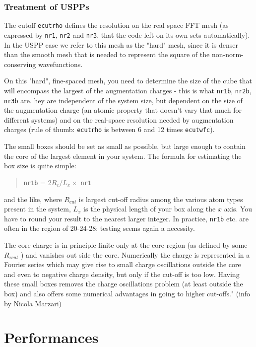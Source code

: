 \documentclass[12pt,a4paper]{article}
\begin{document}
\subsubsection{Treatment of USPPs}

The cutoff \texttt{ecutrho} defines the resolution on the real space FFT mesh (as expressed 
by \texttt{nr1}, \texttt{nr2} and \texttt{nr3}, that the code left on its own sets automatically).
In the USPP case we refer to this mesh as the "hard" mesh, since it 
is denser than the smooth mesh that is needed to represent the square 
of the non-norm-conserving wavefunctions.
  
On this "hard", fine-spaced mesh, you need to determine the size of the
cube that will encompass the largest of the augmentation charges - this
is what \texttt{nr1b}, \texttt{nr2b}, \texttt{nr3b} are. hey are independent 
of the system size, but dependent on the size
of the augmentation charge (an atomic property that doesn't vary 
that much for different systems) and on the
real-space resolution needed by augmentation charges (rule of thumb:
\texttt{ecutrho} is between 6 and 12 times \texttt{ecutwfc}).

The small boxes should be set as small as possible, but large enough
to contain the core of the largest element in your system.
The formula for estimating the box size is quite simple: 
\begin{quote}
   \texttt{nr1b} = $2 R_c / L_x \times$ \texttt{nr1}
\end{quote}
and the like, where $R_{cut}$ is largest cut-off radius among the various atom
types present in the system, $L_x$ is the
physical length of your box along the $x$ axis. You have to round your
result to the nearest larger integer.
In practice, \texttt{nr1b} etc. are often in the region of 20-24-28; testing seems
again a necessity.

The core charge is in principle finite only at the core region (as defined
by some $R_{rcut}$ ) and vanishes out side the core. Numerically the charge is
represented in a Fourier series which may give rise to small charge
oscillations outside the core and even to negative charge density, but
only if the cut-off is too low. Having these small boxes removes the
charge oscillations problem (at least outside the box) and also offers
some numerical advantages in going to higher cut-offs." (info by Nicola Marzari)

\section{Performances}
\end{document}
